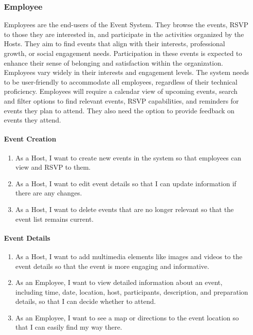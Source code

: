 \documentclass[a4paper,12pt]{article}
\begin{document}
\subsubsection{Employee}
Employees are the end-users of the Event System. They browse the events, RSVP to those they are 
interested in, and participate in the activities organized by the Hosts. They aim to find events 
that align with their interests, professional growth, or social engagement needs. Participation 
in these events is expected to enhance their sense of belonging and satisfaction within the organization. 
Employees vary widely in their interests and engagement levels. The system needs to be user-friendly to accommodate 
all employees, regardless of their technical proficiency. Employees will require a calendar view of upcoming events, 
search and filter options to find relevant events, RSVP capabilities, and reminders for events they plan to attend. 
They also need the option to provide feedback on events they attend.

\paragraph{Event Creation}

\begin{enumerate}
    \item As a Host, I want to create new events in the system so that employees can view and RSVP to them.
    \item As a Host, I want to edit event details so that I can update information if there are any changes.
    \item As a Host, I want to delete events that are no longer relevant so that the event list remains current.
\end{enumerate}

\paragraph{Event Details}

\begin{enumerate}
    \item As a Host, I want to add multimedia elements like images and videos to the event details so that the event 
    is more engaging and informative.
    \item As an Employee, I want to view detailed information about an event, including time, date, location, host, 
    participants, description, and preparation details, so that I can decide whether to attend.
    \item As an Employee, I want to see a map or directions to the event location so that I can easily find my way there.
\end{enumerate}
\end{document}
